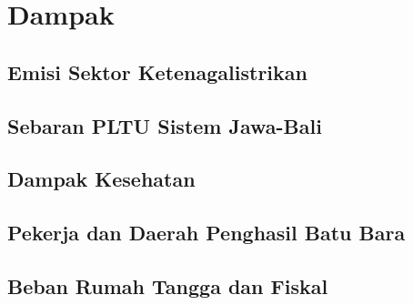 \section{Dampak}
\label{sec:dampak}

\subsection{Emisi Sektor Ketenagalistrikan}

\subsection{Sebaran PLTU Sistem Jawa-Bali}

\subsection{Dampak Kesehatan}

\subsection{Pekerja dan Daerah Penghasil Batu Bara}

\subsection{Beban Rumah Tangga dan Fiskal}

